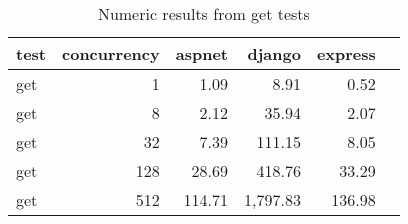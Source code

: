 \FloatBarrier
\begin{table}[!htp]\centering
    \caption{Numeric results from get tests}\label{tab:resultsGet}
    \scriptsize
    \begin{tabular}{lrrrrr}\toprule
        test & concurrency & aspnet & django   & express \\\midrule
get &1 &1.09 &8.91 &0.52 \\
get &8 &2.12 &35.94 &2.07 \\
get &32 &7.39 &111.15 &8.05 \\
get &128 &28.69 &418.76 &33.29 \\
get &512 &114.71 &1,797.83 &136.98 \\
        \bottomrule
    \end{tabular}
\end{table}
\FloatBarrier
